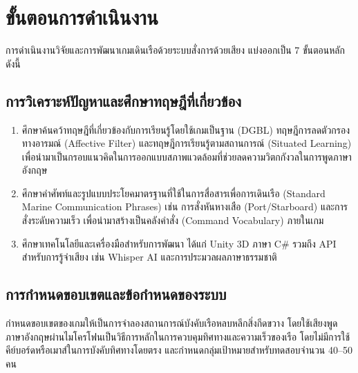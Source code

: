 
\section{ขั้นตอนการดำเนินงาน}

การดำเนินงานวิจัยและการพัฒนาเกมเดินเรือด้วยระบบสั่งการด้วยเสียง แบ่งออกเป็น 7 ขั้นตอนหลัก ดังนี้

\subsection{การวิเคราะห์ปัญหาและศึกษาทฤษฎีที่เกี่ยวข้อง}

\begin{enumerate}[label=(\arabic*)]
    \item ศึกษาค้นคว้าทฤษฎีที่เกี่ยวข้องกับการเรียนรู้โดยใช้เกมเป็นฐาน (DGBL) ทฤษฎีการลดตัวกรองทางอารมณ์ (Affective Filter) และทฤษฎีการเรียนรู้ตามสถานการณ์ (Situated Learning) เพื่อนำมาเป็นกรอบแนวคิดในการออกแบบสภาพแวดล้อมที่ช่วยลดความวิตกกังวลในการพูดภาษาอังกฤษ
    \item ศึกษาคำศัพท์และรูปแบบประโยคมาตรฐานที่ใช้ในการสื่อสารเพื่อการเดินเรือ (Standard Marine Communication Phrases) เช่น การสั่งหันหางเสือ (Port/Starboard) และการสั่งระดับความเร็ว เพื่อนำมาสร้างเป็นคลังคำสั่ง (Command Vocabulary) ภายในเกม
    \item ศึกษาเทคโนโลยีและเครื่องมือสำหรับการพัฒนา ได้แก่ Unity 3D ภาษา C\# รวมถึง API สำหรับการรู้จำเสียง เช่น Whisper AI และการประมวลผลภาษาธรรมชาติ
\end{enumerate}

\subsection{การกำหนดขอบเขตและข้อกำหนดของระบบ}

กำหนดขอบเขตของเกมให้เป็นการจำลองสถานการณ์บังคับเรือหลบหลีกสิ่งกีดขวาง โดยใช้เสียงพูดภาษาอังกฤษผ่านไมโครโฟนเป็นวิธีการหลักในการควบคุมทิศทางและความเร็วของเรือ โดยไม่มีการใช้คีย์บอร์ดหรือเมาส์ในการบังคับทิศทางโดยตรง และกำหนดกลุ่มเป้าหมายสำหรับทดสอบจำนวน 40--50 คน

